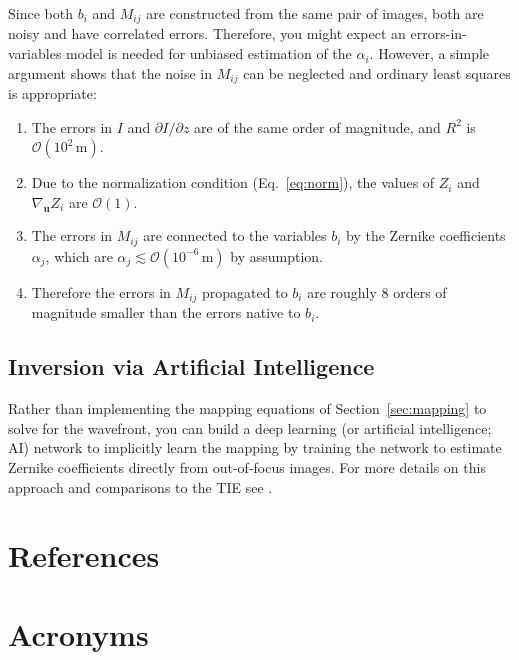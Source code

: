 \documentclass[TS,authoryear,toc]{lsstdoc}
\begin{document}
Since both $b_i$ and $M_{ij}$ are constructed from the same pair of images, both are noisy and have correlated errors.
Therefore, you might expect an errors-in-variables model is needed for unbiased estimation of the $\alpha_i$.
However, a simple argument shows that the noise in $M_{ij}$ can be neglected and ordinary least squares is appropriate:
\begin{enumerate}
    \item The errors in $I$ and $\partial I / \partial z$ are of the same order of magnitude, and $R^2$ is $\mathcal{O}(10^2 \,\text{m})$.
    \item Due to the normalization condition (Eq.~\ref{eq:norm}), the values of $Z_i$ and $\nabla_\mathbf{u} Z_i$ are $\mathcal{O}(1)$.
    \item The errors in $M_{ij}$ are connected to the variables $b_i$ by the Zernike coefficients $\alpha_j$, which are  $\alpha_j \lesssim \mathcal{O}(10^{-6} \,\text{m})$ by assumption.
    \item Therefore the errors in $M_{ij}$ propagated to $b_i$ are roughly 8 orders of magnitude smaller than the errors native to $b_i$.
    
\end{enumerate}


\subsection{Inversion via Artificial Intelligence}
\label{sec:ai}

Rather than implementing the mapping equations of Section~\ref{sec:mapping} to solve for the wavefront, you can build a deep learning (or artificial intelligence; AI) network to implicitly learn the mapping by training the network to estimate Zernike coefficients directly from out-of-focus images.
For more details on this approach and comparisons to the TIE see \citet{2024AJ....167...86C}.


\appendix
\section{References} \label{sec:bib}
\vspace*{-1.25cm}
\renewcommand{\refname}{} %


\section{Acronyms} \label{sec:acronyms}

\end{document}
